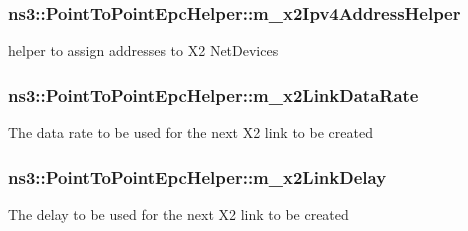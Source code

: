 \subsubsection[{\texorpdfstring{m\+\_\+x2\+Ipv4\+Address\+Helper}{m_x2Ipv4AddressHelper}}]{ ns3\+::\+Point\+To\+Point\+Epc\+Helper\+::m\+\_\+x2\+Ipv4\+Address\+Helper\hspace{0.3cm}{\ttfamily [private]}}\hypertarget{classns3_1_1PointToPointEpcHelper_a76f33ada1109b59e1c790703db453c89}{}\label{classns3_1_1PointToPointEpcHelper_a76f33ada1109b59e1c790703db453c89}
helper to assign addresses to X2 Net\+Devices 
\subsubsection[{\texorpdfstring{m\+\_\+x2\+Link\+Data\+Rate}{m_x2LinkDataRate}}]{ ns3\+::\+Point\+To\+Point\+Epc\+Helper\+::m\+\_\+x2\+Link\+Data\+Rate\hspace{0.3cm}{\ttfamily [private]}}\hypertarget{classns3_1_1PointToPointEpcHelper_a4f9ea604fa9ce578c054beb863f930b0}{}\label{classns3_1_1PointToPointEpcHelper_a4f9ea604fa9ce578c054beb863f930b0}
The data rate to be used for the next X2 link to be created 
\subsubsection[{\texorpdfstring{m\+\_\+x2\+Link\+Delay}{m_x2LinkDelay}}]{ ns3\+::\+Point\+To\+Point\+Epc\+Helper\+::m\+\_\+x2\+Link\+Delay\hspace{0.3cm}{\ttfamily [private]}}\hypertarget{classns3_1_1PointToPointEpcHelper_a93bb73393a99dc8f2f03a0e7e3b38fa0}{}\label{classns3_1_1PointToPointEpcHelper_a93bb73393a99dc8f2f03a0e7e3b38fa0}
The delay to be used for the next X2 link to be created 
